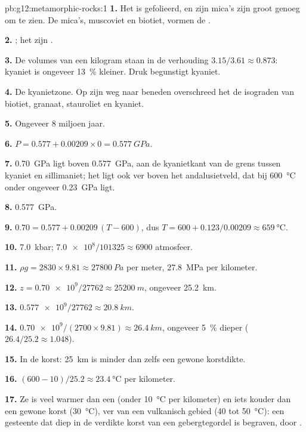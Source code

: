 \begin{solution}{pb:g12:metamorphic-rocks:1}
\textbf{1.} Het is gefolieerd, en zijn mica's zijn groot genoeg om te zien. De
mica's, muscoviet en biotiet, vormen de .

\textbf{2.} ; het zijn .

\textbf{3.} De volumes van een kilogram staan in de verhouding $3.15/3.61 \approx
0.873$: kyaniet is ongeveer \qty{13}{\percent} kleiner. Druk begunstigt
kyaniet.

\textbf{4.} De kyanietzone. Op zijn weg naar beneden overschreed het de isograden van biotiet,
granaat, stauroliet en kyaniet.

\textbf{5.} Ongeveer 8 miljoen jaar.

\textbf{6.} $P = 0.577 + 0.00209 \times 0 = \qty{0.577}{GPa}$.

\textbf{7.} \qty{0.70}{GPa} ligt boven \qty{0.577}{GPa}, aan de kyanietkant van
de grens tussen kyaniet en sillimaniet; het ligt ook ver boven het andalusietveld,
dat bij \qty{600}{\celsius} onder ongeveer \qty{0.23}{GPa} ligt.

\textbf{8.} \qty{0.577}{GPa}.

\textbf{9.} $0.70 = 0.577 + 0.00209\,(T - 600)$, dus $T = 600 +
0.123/0.00209 \approx \qty{659}{\celsius}$.

\textbf{10.} \qty{7.0}{kbar}; $\num{7.0e8}/101325 \approx \num{6900}$
atmosfeer.

\textbf{11.} $\rho g = 2830 \times 9.81 \approx \qty{27800}{Pa}$ per meter,
\qty{27.8}{MPa} per kilometer.

\textbf{12.} $z = \num{0.70e9}/\num{27762} \approx \qty{25200}{m}$, ongeveer
\qty{25.2}{km}.

\textbf{13.} $\num{0.577e9}/\num{27762} \approx \qty{20.8}{km}$.

\textbf{14.} $\num{0.70e9}/(2700 \times 9.81) \approx \qty{26.4}{km}$, ongeveer
\qty{5}{\percent} dieper ($26.4/25.2 \approx 1.048$).

\textbf{15.} In de korst: \qty{25}{km} is minder dan zelfs een gewone
korstdikte.

\textbf{16.} $(600 - 10)/25.2 \approx \qty{23.4}{\celsius}$ per kilometer.

\textbf{17.} Ze is veel warmer dan een  (onder
\qty{10}{\celsius} per kilometer) en iets kouder dan een gewone korst
(\qty{30}{\celsius}), ver van een vulkanisch gebied (40 tot \qty{50}{\celsius}): een
gesteente dat diep in de verdikte korst van een gebergtegordel is begraven, door .


\end{solution}
